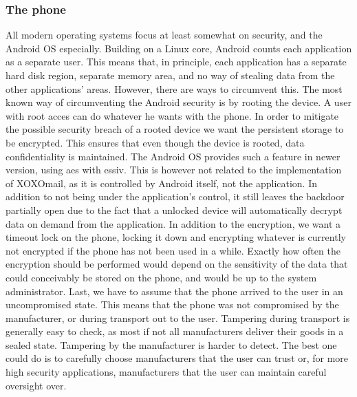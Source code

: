 \subsubsection{The phone}
All modern operating systems focus at least somewhat on security, and the Android OS especially. Building on a Linux core, Android counts each application as a separate user. This means that, in principle, each application has a separate hard disk region, separate memory area, and no way of stealing data from the other applications’ areas. However, there are ways to circumvent this.
\newline
\newline
The most known way of circumventing the Android security is by rooting the device. A user with root acces can do whatever he wants with the phone.
\newline
\newline
In order to mitigate the possible security breach of a rooted device we want the persistent storage to be encrypted. This ensures that even though the device is rooted, data confidentiality is maintained. The Android OS provides such a feature in newer version, using \gls{aes} with \gls{essiv}. This is however not related to the implementation of XOXOmail, as it is controlled by Android itself, not the application. In addition to not being under the application's control, it still leaves the backdoor partially open due to the fact that a unlocked device will automatically decrypt data on demand from the application. 
\newline
\newline
In addition to the encryption, we want a timeout lock on the phone, locking it down and encrypting whatever is currently not encrypted if the phone has not been used in a while. Exactly how often the encryption should be performed would depend on the sensitivity of the data that could conceivably be stored on the phone, and would be up to the system administrator.
Last, we have to assume that the phone arrived to the user in an uncompromised state. This means that the phone was not compromised by the manufacturer, or during transport out to the user. Tampering during transport is generally easy to check, as most if not all manufacturers deliver their goods in a sealed state. Tampering by the manufacturer is harder to detect. The best one could do is to carefully choose manufacturers that the user can trust or, for more high security applications, manufacturers that the user can maintain careful oversight over.

